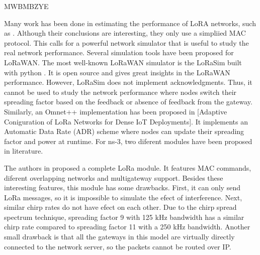 \cite{reynders_lorawan_2018} MWBMBZYE


Many work has been done in estimating the performance of LoRA networks,
	such as \cite{adelantado_understanding_2017} \cite{augustin_study_2016} \cite{mikhaylov_analysis_2016}.
Although their conclusions are interesting,
	they only use a simpliied MAC protocol.
This calls for a powerful network simulator that is useful to study the real network performance.
Several simulation tools have been proposed for LoRaWAN.
The most well-known LoRaWAN simulator is the LoRaSim built with python \cite{bor_lora_2016} \cite{voigt_mitigating_2016}.
It is open source and gives great insights in the LoRaWAN performance.
However,
	LoRaSim does not implement acknowledgments.
Thus,
	it cannot be used to study the network performance where nodes switch their spreading factor based on the feedback or absence of feedback from the gateway.
Similarly,
	an Omnet++ implementation has been proposed in [Adaptive Coniguration of LoRa Networks for Dense IoT Deployments].
It implements an Automatic Data Rate (ADR) scheme where nodes can update their spreading factor and power at runtime.
For ns-3,
	two diferent modules have been proposed in literature.

The authors in \cite{magrin_performance_2017} proposed a complete LoRa module.
It features MAC commands,
	diferent overlapping networks and multigateway support.
Besides these interesting features,
	this module has some drawbacks.
First,
	it can only send LoRa messages,
	so it is impossible to simulate the efect of interference.
Next,
	similar chirp rates do not have efect on each other.
Due to the chirp spread spectrum technique,
	spreading factor 9 with 125 kHz bandwidth has a similar chirp rate compared to spreading factor 11 with a 250 kHz bandwidth.
Another small drawback is that all the gateways in this model are virtually directly connected to the network server,
	so the packets cannot be routed over IP.

